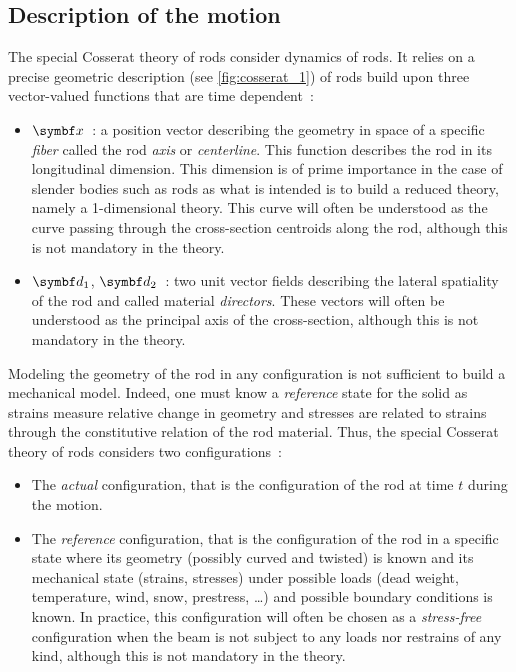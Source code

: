 \subsection{Description of the motion}\label{sec=cosserat_motion}
The special Cosserat theory of rods consider dynamics of rods. It relies on a precise geometric description (see \cref{fig:cosserat_1}) of rods build upon three vector-valued functions that are time dependent~:
\begin{itemize}
\item
$\vect{x}$~: a position vector describing the geometry in space of a specific \emph{fiber} called the rod \emph{axis} or \emph{centerline}. This function describes the rod in its longitudinal dimension. This dimension is of prime importance in the case of slender bodies such as rods as what is intended is to build a reduced theory, namely a 1-dimensional theory. This curve will often be understood as the curve passing through the cross-section centroids along the rod, although this is not mandatory in the theory.
\item
$\vect{d}_1$, $\vect{d}_2$~: two unit vector fields describing the lateral spatiality of the rod and called material \emph{directors}. These vectors will often be understood as the principal axis of the cross-section, although this is not mandatory in the theory.
\end{itemize}
Modeling the geometry of the rod in any configuration is not sufficient to build a mechanical model. Indeed, one must know a \emph{reference} state for the solid as strains measure relative change in geometry and stresses are related to strains through the constitutive relation of the rod material. Thus, the special Cosserat theory of rods considers two configurations~:
\begin{itemize}
\item
The \emph{actual} configuration, that is the configuration of the rod at time $t$ during the motion.
\item
The \emph{reference} configuration, that is the configuration of the rod in a specific state where its geometry (possibly curved and twisted) is known and its mechanical state (strains, stresses) under possible loads (dead weight, temperature, wind, snow, prestress, \dots) and possible boundary conditions is known. In practice, this configuration will often be chosen as a \emph{stress-free} configuration when the beam is not subject to any loads nor restrains of any kind, although this is not mandatory in the theory.
\end{itemize}
